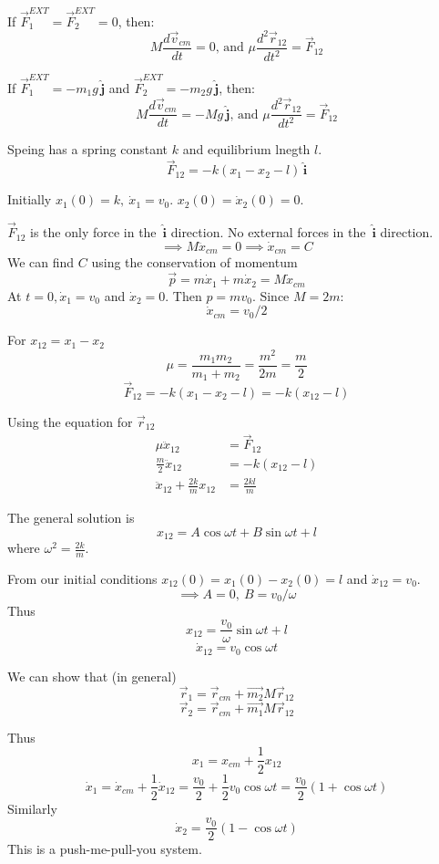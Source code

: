 \documentclass[twoside]{scrartcl}
\newcommand{\vsp}{\vspace*{5pt}}
\let\oldhat\hat
\renewcommand{\hat}[1]{\,\oldhat{\boldsymbol{\mathbf{#1}}}}
\begin{document}
If $\vec{F}_1^{EXT} = \vec{F}^{EXT}_2 = 0$, then: \[M\dfrac{d\vec{v}_{cm}}{dt} = 0\text{, and }\mu\dfrac{d^2\vec{r}_{12}}{dt^2}  = \vec{F}_{12}\]

If $\vec{F}_1^{EXT} = -m_1g\hat{j}$ and $\vec{F}^{EXT}_2 = -m_2g\hat{j}$, then: \[M\dfrac{d\vec{v}_{cm}}{dt} = -Mg\hat{j}\text{, and }\mu\dfrac{d^2\vec{r}_{12}}{dt^2}  = \vec{F}_{12}\]\vsp

\begin{example}[Spring]
\vspace*{50pt}

Speing has a spring constant $k$ and equilibrium lnegth $l$. 
\[\vec{F}_{12} = -k(x_1 - x_2 - l)\hat{i}\]

Initially $x_1(0) = k,~ \dot{x}_1 = v_0$. $x_2(0) = \dot{x}_2(0) = 0$.

$\vec{F}_{12}$ is the only force in the $\hat{i}$ direction. No external forces in the $\hat{i}$ direction. 
\[\implies M\ddot{x}_{cm} = 0 \implies \dot{x}_{cm} = C\]
We can find $C$ using the conservation of momentum
\[\vec{p} = m\dot{x}_1 + m\dot{x}_2 = M\dot{x}_{cm}\]
At $t = 0, \dot{x}_1 = v_0$ and $\dot{x}_2 = 0$. Then $p = mv_0$. Since $M = 2m$:
\[\dot{x}_{cm} = v_0/2\]

For $x_{12} = x_1 - x_2$
\[\mu = \frac{m_1m_2}{m_1 + m_2} = \frac{m^2}{2m} = \frac{m}{2}\]
\[\vec{F}_{12} = -k(x_1 - x_2 - l) = -k(x_{12} - l)\]

Using the equation for $\vec{r}_{12}$
\[\begin{aligned}\mu\ddot{x}_{12} &= \vec{F}_{12}\\
\frac{m}{2}\ddot{x}_{12} &= -k(x_{12} - l)\\
\ddot{x}_{12} + \frac{2k}{m}x_{12} &= \frac{2kl}{m}	
\end{aligned}
\]

The general solution is 
\[x_{12} = A\cos\omega t + B\sin\omega t + l\]
where $\omega^2 = \frac{2k}{m}$. 

From our initial conditions $x_{12}(0) = x_1(0) - x_2(0) = l$ and $\dot{x}_{12} = v_0$. 
\[\implies A = 0,~B = v_0/\omega\]Thus
\[x_{12} = \frac{v_0}{\omega}\sin\omega t + l\]
\[\dot{x}_{12} = v_0\cos\omega t\]

We can show that (in general)
\[\vec{r}_1 = \vec{r}_{cm} + \vec{m_2}{M}\vec{r}_{12}\]
\[\vec{r}_2 = \vec{r}_{cm} + \vec{m_1}{M}\vec{r}_{12}\]

Thus
\[x_1 = x_{cm} + \frac{1}{2}x_{12}\]
\[\dot{x}_1 = \dot{x}_{cm} + \frac{1}{2}\dot{x}_{12} = \frac{v_0}{2} + \frac{1}{2}v_0\cos\omega t = \frac{v_0}{2}(1+\cos\omega t)\]
Similarly 
\[\dot{x}_2 =  \frac{v_0}{2}(1 - \cos\omega t)\]
This is a push-me-pull-you system.
\end{example}
\end{document}
